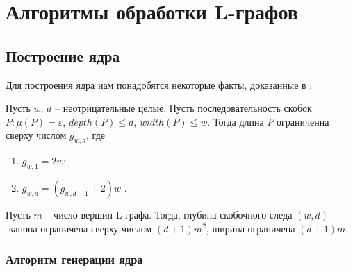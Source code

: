 \chapter{Алгоритмы обработки L-графов} \label{chapter2} 


\section{Построение ядра}
Для построения ядра нам понадобятся некоторые факты, доказанные в \cite{stan1}:

\begin{theorem}
    \label{canon_length_limit_theorem}
    Пусть $w$, $d$ -- неотрицательные целые. Пусть последовательность скобок $P : \mu(P)=\varepsilon$, $depth(P) \leq d$, $width(P) \leq w$. 
    Тогда длина $P$ ограниченна сверху числом $g_{w,d}$, где 
    \begin{enumerate}
        \item $g_{w,1} = 2w$;
        \item $g_{w,d} = (g_{w,d-1} + 2)w$ .
    \end{enumerate}
\end{theorem}
\begin{lemma}
    \label{wd_upper_limit_lemma}
    Пусть $m$ -- число вершин L-графа. Тогда, глубина скобочного следа $(w,d)$-канона ограничена сверху числом $(d+1)m^2$, ширина ограничена $(d+1)m$.
\end{lemma}

\subsection*{Алгоритм генерации ядра}

